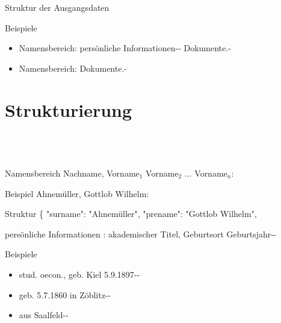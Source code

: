\documentclass[12pt]{beamer}
\begin{document}
\begin{large}
\begin{frame}{Struktur der Ausgangsdaten}
 \vspace*{\fill}
 \begin{block}{Beispiele}
  \begin{itemize}
   \normalsize
   \item Namensbereich: persönliche Informationen-{}- Dokumente.-
   \item Namensbereich: Dokumente.-
  \end{itemize}
 \end{block}
\end{frame} 


\section{Strukturierung}
 \subsection*{~}
 
\begin{frame}{Namensbereich}
 Nachname, Vorname$_1$ Vorname$_2$ ... Vorname$_n$:

 \vspace*{\fill}
 \begin{block}{Beispiel}
 \normalsize Ahnemüller, Gottlob Wilhelm:
 \end{block}

 \begin{block}{Struktur}
  \normalsize
  \{
  \newline
  \hspace*{0.5cm}
  "{}surname"{}: "{}Ahnemüller"{},
  \newline
  \hspace*{0.5cm}    
  "{}prename"{}: "{}Gottlob Wilhelm"{},
 \end{block} 
\end{frame}


\begin{frame}{persönliche Informationen}
 : akademischer Titel, Geburtsort Geburtsjahr-{}-

 \vspace*{\fill}
 \begin{block}{Beispiele}
  \normalsize
  \begin{itemize}
   \item stud. oecon., geb. Kiel 5.9.1897-{}-
   \item geb. 5.7.1860 in  Zöblitz-{}-
   \item aus Saalfeld-{}-
  \end{itemize}
 \end{block}
 

\end{frame}
\end{large}
\end{document}
